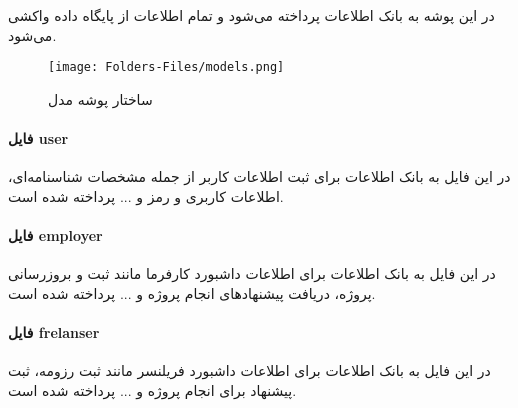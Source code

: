 در این پوشه به بانک اطلاعات پرداخته می‌شود و تمام اطلاعات از پایگاه داده واکشی می‌شود.

\begin{figure}[H]
	\texttt{[image: Folders-Files/models.png]}
	\centering
	\caption{ساختار پوشه مدل}
	\label{fig:folder-models}
\end{figure}

\paragraph{فایل user}
در این فایل به بانک اطلاعات برای ثبت اطلاعات کاربر از جمله مشخصات شناسنامه‌ای، اطلاعات کاربری و رمز و ... پرداخته شده است.

\paragraph{فایل employer}
در این فایل به بانک اطلاعات برای اطلاعات داشبورد کارفرما مانند ثبت و بروزرسانی پروژه، دریافت پیشنهادهای انجام پروژه و ... پرداخته شده است.

\paragraph{فایل frelanser}
در این فایل به بانک اطلاعات برای ‌اطلاعات داشبورد فریلنسر مانند ثبت رزومه، ثبت پیشنهاد برای انجام پروژه و ... پرداخته شده است.
